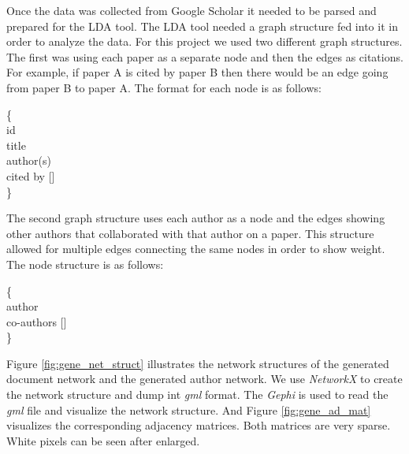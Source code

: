 \documentclass[letterpaper]{article}
\begin{document}
Once the data was collected from Google Scholar it needed to be parsed and prepared for the LDA tool.
The LDA tool needed a graph structure fed into it in order to analyze the data.
For this project we used two different graph structures.
The first was using each paper as a separate node and then the edges as citations.
For example, if paper A is cited by paper B then there would be an edge going from paper B to paper A.
The format for each node is as follows:
\begin{framed}
\noindent
\{\\
\indent\indent id \\
\indent\indent title \\
\indent\indent author(s) \\
\indent\indent cited by []\\
\}
\end{framed}

The second graph structure uses each author as a node and the edges showing other authors that collaborated with that author on a paper.
This structure allowed for multiple edges connecting the same nodes in order to show weight.
The node structure is as follows:
\begin{framed}
\noindent
\{\\
\indent\indent author \\
\indent\indent co-authors [] \\
\}
\end{framed}

Figure \ref{fig:gene_net_struct} illustrates the network structures of the generated document network and the generated author network.
We use \emph{NetworkX} to create the network structure and dump int \emph{gml} format.
The \emph{Gephi} is used to read the \emph{gml} file and visualize the network structure.
And Figure \ref{fig:gene_ad_mat} visualizes the corresponding adjacency matrices.
Both matrices are very sparse.
White pixels can be seen after enlarged.
\end{document}
